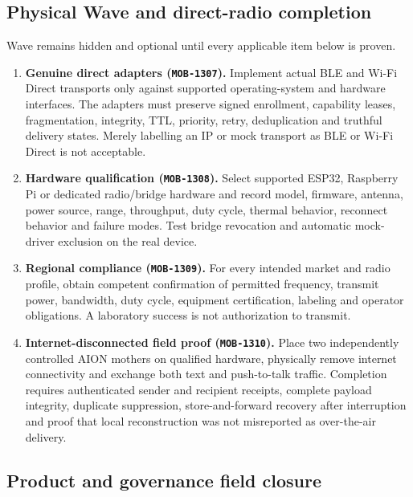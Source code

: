 \subsection{Physical Wave and direct-radio completion}

Wave remains hidden and optional until every applicable item below is proven.

\begin{enumerate}
  \item \textbf{Genuine direct adapters (\texttt{MOB-1307}).} Implement actual BLE
  and Wi-Fi Direct transports only against supported operating-system and hardware
  interfaces.  The adapters must preserve signed enrollment, capability leases,
  fragmentation, integrity, TTL, priority, retry, deduplication and truthful delivery
  states.  Merely labelling an IP or mock transport as BLE or Wi-Fi Direct is not
  acceptable.

  \item \textbf{Hardware qualification (\texttt{MOB-1308}).} Select supported
  ESP32, Raspberry Pi or dedicated radio/bridge hardware and record model, firmware,
  antenna, power source, range, throughput, duty cycle, thermal behavior, reconnect
  behavior and failure modes.  Test bridge revocation and automatic mock-driver
  exclusion on the real device.

  \item \textbf{Regional compliance (\texttt{MOB-1309}).} For every intended
  market and radio profile, obtain competent confirmation of permitted frequency,
  transmit power, bandwidth, duty cycle, equipment certification, labeling and
  operator obligations.  A laboratory success is not authorization to transmit.

  \item \textbf{Internet-disconnected field proof (\texttt{MOB-1310}).} Place two
  independently controlled AION mothers on qualified hardware, physically remove
  internet connectivity and exchange both text and push-to-talk traffic.  Completion
  requires authenticated sender and recipient receipts, complete payload integrity,
  duplicate suppression, store-and-forward recovery after interruption and proof that
  local reconstruction was not misreported as over-the-air delivery.
\end{enumerate}

\subsection{Product and governance field closure}


